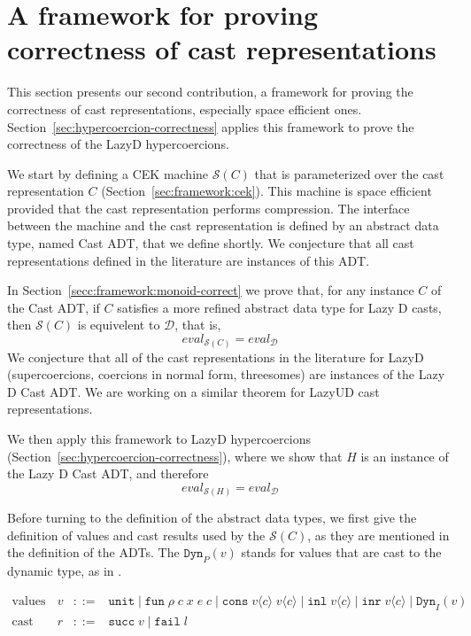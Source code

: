 \documentclass[acmsmall,review,anonymous]{acmart}\settopmatter{printfolios=true,printccs=false,printacmref=false}
\newcommand{\stxrule}[3]{\text{#2} & #1 & ::= & #3\\}
\newcommand{\lazyUD}{Lazy\;UD}
\newcommand{\lazyD}{Lazy\;D}
\newcommand{\rOOsucc}[1]{\mathtt{succ}\;#1}
\newcommand{\rOOfail}[1]{\mathtt{fail}\;#1}
\newcommand{\hcvOOinj}[2]{\mathtt{Dyn}_{#1}(#2)}
\newcommand{\hcvOOfun}[5]{\mathtt{fun} \; #2 \; #1 \; #3 \; #4 \; #5}
\newcommand{\hcvOOtt}[0]{\mathtt{unit}}
\newcommand{\hcvOOcons}[4]{\mathtt{cons}\;#1\langle#2\rangle\;#3\langle#4\rangle}
\newcommand{\hcvOOinl}[2]{\mathtt{inl}\;#1\langle#2\rangle}
\newcommand{\hcvOOinr}[2]{\mathtt{inr}\;#1\langle#2\rangle}
\newcommand{\ineffCEKD}{$\mathcal{D}$}
\newcommand{\effCEK}[1]{$\mathcal{S}(#1)$}
\newcommand{\evalEqv}[2]{\ensuremath{eval_{\text{#1}} = eval_{\text{#2}}}}
\begin{document}
\section{A framework for proving correctness of cast representations}
\label{sec:framework}

This section presents our second contribution, a framework for proving
the correctness of cast representations, especially space efficient
ones. Section~\ref{sec:hypercoercion-correctness} applies this
framework to prove the correctness of the \lazyD{} hypercoercions.

We start by defining a CEK machine \effCEK{C} that is parameterized
over the cast representation $C$
(Section~\ref{sec:framework:cek}). This machine is space efficient
provided that the cast representation performs compression.  The
interface between the machine and the cast representation is defined
by an abstract data type, named Cast ADT, that we define shortly.  We
conjecture that all cast representations defined in the literature
are instances of this ADT.

In Section~\ref{secc:framework:monoid-correct} we prove that, for any
instance $C$ of the Cast ADT, if $C$ satisfies a more refined abstract
data type for Lazy D casts, then \effCEK{C} is equivelent to
\ineffCEKD{}, that is,
\[
  \evalEqv{\effCEK{C}}{\ineffCEKD}
\]
We conjecture that all of the cast representations in the literature
for \lazyD{} (supercoercions, coercions in normal form, threesomes)
are instances of the Lazy D Cast ADT.  We are working on a similar
theorem for \lazyUD{} cast representations.

We then apply this framework to \lazyD{} hypercoercions
(Section~\ref{sec:hypercoercion-correctness}), where we show that $H$
is an instance of the Lazy D Cast ADT, and therefore
\[
  \evalEqv{\effCEK{H}}{\ineffCEKD}
\]

Before turning to the definition of the abstract data types, we first
give the definition of values and cast results used by the \effCEK{C}, as they 
are mentioned in the definition of the ADTs. The $\hcvOOinj{P}{v}$ stands for 
values that are cast to the dynamic type, as in \citet{wadler2009well}.

\begin{definition}[Values and cast results for the \effCEK{C} machine] 
\label{def:values-effCEK}
  \[
  \begin{array}{rclr}
  \stxrule{v}{values}{
    \hcvOOtt \mid
    \hcvOOfun{c}{\rho}{x}{e}{c} \mid
    \hcvOOcons{v}{c}{v}{c} \mid
    \hcvOOinl{v}{c} \mid
    \hcvOOinr{v}{c} \mid
    \hcvOOinj{I}{v}
  }
\stxrule{r}{cast results}{
  \rOOsucc{v} \mid
  \rOOfail{l}
}
  \end{array}
  \]
\end{definition}
\end{document}
